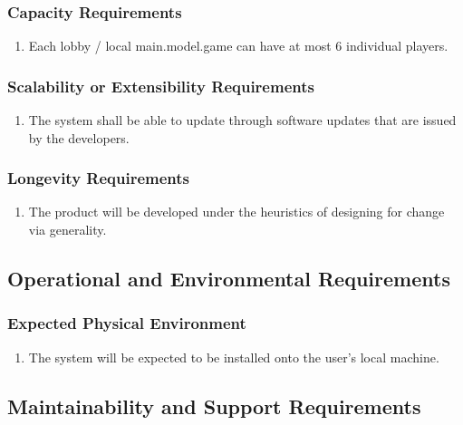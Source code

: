 \documentclass[12pt, titlepage]{article}
\begin{document}
    \subsubsection{Capacity Requirements}
    \begin{enumerate}[label=PR\arabic*.]
        \item Each lobby / local main.model.game can have at most 6 individual players.
    \end{enumerate}
    \subsubsection{Scalability or Extensibility Requirements}
    \begin{enumerate}[label=PR\arabic*.]
        \item The system shall be able to update through software updates that are issued by the developers.
    \end{enumerate}
    \subsubsection{Longevity Requirements}
    \label{ssub:longevity_requirements}
    \begin{enumerate}[label=PR\arabic*.]
        \item The product will be developed under the heuristics of designing for change via generality.  
    \end{enumerate}
\subsection{Operational and Environmental Requirements}
    \subsubsection{Expected Physical Environment}
    \label{ssub:expected_physical_environment}
    \begin{enumerate}[label=OE\arabic*.]
        \item The system will be expected to be installed onto the user's local machine.
    \end{enumerate}
    
\subsection{Maintainability and Support Requirements}
    
\end{document}
